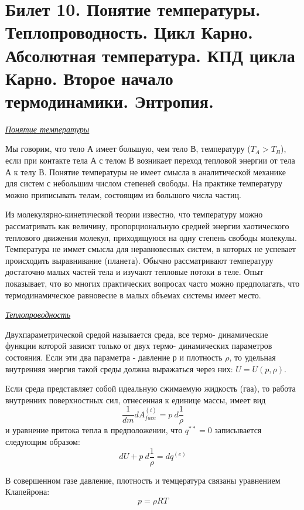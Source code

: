 \newpage
\section{Билет 10. Понятие температуры. Теплопроводность. Цикл Карно. Абсолютная температура. КПД цикла Карно. Второе начало термодинамики. Энтропия.}



\begin{center}
	\textit{\underline{Понятие температуры}}
\end{center}

Мы говорим, что тело А имеет большую, чем тело В, температуру ($T_A > T_B$), если при контакте тела А с телом В возникает переход тепловой энергии от тела А к телу В. Понятие температуры не имеет смысла в аналитической механике для систем с небольшим числом степеней свободы. На практике температуру можно приписывать телам, состоящим из большого числа частиц. 

Из молекулярно-кинетической теории известно, что температуру можно рассматривать как величину, пропорциональную средней энергии хаотического теплового движения молекул, приходящуюся на одну степень свободы молекулы.  Температура не иммет смысла для неравновесных систем, в которых не успевает происходить выравнивание (планета).  Обычно рассматривают температуру достаточно малых частей тела и изучают тепловые потоки в теле. Опыт показывает, что во многих практических вопросах часто можно предполагать, что термодинамическое равновесие в малых объемах системы имеет место.  


\begin{center}
	\textit{\underline{Теплопроводность}}
\end{center}

Двухпараметрической средой называется среда, все термо- динамические функции которой зависят только от двух термо- динамических параметров состояния. Если эти два параметра - давление р и плотность $\rho$, то удельная внутренняя энергия такой среды должна выражаться через них: $U = U (p, \rho)$.

Если среда представляет собой идеальную сжимаемую жидкость (гаа), то работа внутренних поверхностных сил, отнесенная к единице массы, имеет вид
$$ \frac{1}{dm}dA_{face}^{(i)} = p\ d\frac{1}{\rho} $$
и уравнение притока тепла в предположении, что $q^{**} = 0$ записывается следующим образом:
$$ dU + p\ d\frac{1}{\rho} = dq^{(e)} $$

В совершенном газе давление, плотность и темцература связаны уравнением Клапейрона:
$$ p = \rho R T $$

